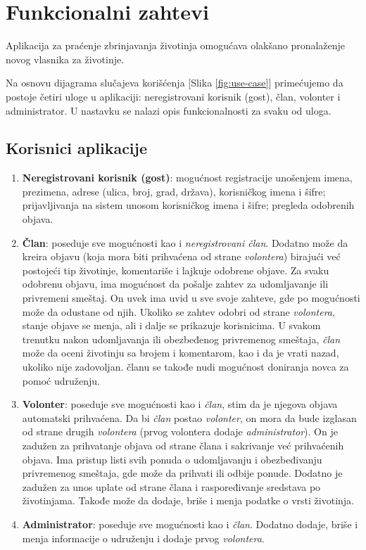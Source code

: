 \section{Funkcionalni zahtevi}
\par Aplikacija za praćenje zbrinjavanja životinja omogućava olakšano pronalaženje novog vlasnika za životinje. 
\par Na osnovu dijagrama slučajeva korišćenja [Slika \ref{fig:use-case}] primećujemo da postoje četiri uloge u aplikaciji: neregistrovani korisnik (gost), član, volonter i administrator. 
U nastavku se nalazi opis funkcionalnosti za svaku od uloga.
\subsection{Korisnici aplikacije}
\begin{enumerate}
    \item \textbf{Neregistrovani korisnik (gost)}: mogućnost registracije unošenjem imena, prezimena, adrese (ulica, broj, grad, država), korisničkog imena i šifre;
    prijavljivanja na sistem unosom korisničkog imena i šifre; pregleda odobrenih objava.
    \item \textbf{Član}: poseduje sve mogućnosti kao i \textit{neregistrovani član}. Dodatno može da kreira objavu (koja mora biti prihvaćena od strane
    \textit{volontera}) birajući već postojeći tip životinje, komentariše i lajkuje odobrene objave. Za svaku odobrenu objavu, ima mogućnost da pošalje zahtev za udomljavanje ili 
    privremeni smeštaj. On uvek ima uvid u sve svoje zahteve, gde po mogućnosti može da odustane od njih. Ukoliko se zahtev odobri od strane \textit{volontera}, stanje objave se menja, 
    ali i dalje se prikazuje korisnicima. U svakom trenutku nakon udomljavanja ili obezbeđenog privremenog smeštaja, \textit{član} može da oceni životinju sa brojem i komentarom, 
    kao i da je vrati nazad, ukoliko nije zadovoljan. članu se takođe nudi mogućnost doniranja novca za pomoć udruženju.
    \item \textbf{Volonter}: poseduje sve mogućnosti kao i \textit{član}, stim da je njegova objava automatski prihvaćena. Da bi \textit{član} postao \textit{volonter}, on mora
    da bude izglasan od strane drugih \textit{volontera} (prvog volontera dodaje \textit{administrator}). On je zadužen za prihvatanje objava od strane člana i sakrivanje već 
    prihvaćenih objava. Ima pristup listi svih ponuda o udomljavanju i obezbeđivanju privremenog smeštaja, gde može da prihvati ili odbije ponude. Dodatno je zadužen za unos uplate od 
    strane člana i raspoređivanje sredstava po životinjama. Takođe može da dodaje, briše i menja podatke o vrsti životinja. 
    \item \textbf{Administrator}: poseduje sve mogućnosti kao i \textit{član}. Dodatno dodaje, briše i menja informacije o udruženju i dodaje prvog \textit{volontera}.
\end{enumerate}
